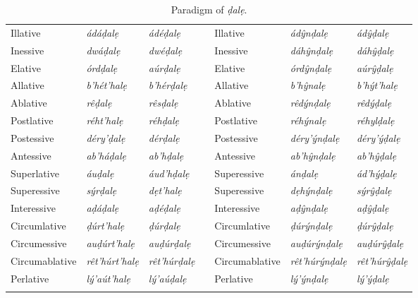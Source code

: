 \documentclass[a4paper, 12pt, twoside, openright, final]{book}
\let \w \textit
\begin{document}
\begin{longtable}{l|>{\it}l|>{\it}lll|>{\it}l|>{\it}l}
Illative          & ádáḍalẹ          & ádéḍalẹ            && Illative        & ádŷnḍalẹ        & ádŷḍalẹ     \\
Inessive          & dwáḍalẹ          & dwéḍalẹ            && Inessive        & dáhŷnḍalẹ       & dáhŷḍalẹ    \\
Elative           & órdḍalẹ          & aúrḍalẹ            && Elative         & órdŷnḍalẹ       & aúrŷḍalẹ    \\
Allative          & b’hét’halẹ       & b’hérḍalẹ          && Allative        & b’hŷnalẹ        & b’hýt’halẹ  \\
Ablative          & rêḍalẹ           & rêsḍalẹ            && Ablative        & rêdýnḍalẹ       & rêdýḍalẹ    \\
Postlative        & réht’halẹ        & réhḍalẹ            && Postlative      & réhýnalẹ        & réhylḍalẹ   \\
Postessive        & déry’ḍalẹ        & dérḍalẹ            && Postessive      & déry’ýnḍalẹ     & déry’ýḍalẹ  \\
Antessive         & ab’háḍalẹ        & ab’hḍalẹ           && Antessive       & ab’hŷnḍalẹ      & ab’hŷḍalẹ   \\
Superlative       & áuḍalẹ           & áud’hḍalẹ          && Superessive     & ánḍalẹ          & ád’hýḍalẹ   \\
Superessive       & sýrḍalẹ          & dẹt’halẹ           && Superessive     & dẹhýnḍalẹ       & sýrŷḍalẹ    \\
Interessive       & aḍáḍalẹ          & aḍéḍalẹ            && Interessive     & aḍŷnḍalẹ        & aḍŷḍalẹ     \\
Circumlative      & ḍúrt’halẹ        & ḍúrḍalẹ            && Circumlative    & ḍúrýnḍalẹ       & ḍúrŷḍalẹ    \\
Circumessive      & auḍúrt’halẹ      & auḍúrḍalẹ          && Circumessive    & auḍúrýnḍalẹ     & auḍúrŷḍalẹ  \\
Circumablative    & rêt’húrt’halẹ    & rêt’húrḍalẹ        && Circumablative  & rêt’húrýnḍalẹ   & rêt’húrŷḍalẹ \\
Perlative         & lý’aút’halẹ      & lý’aúḍalẹ          && Perlative       & lý’ýnḍalẹ       & lý’ýḍalẹ     \\
\noalign{\medskip}
\caption{Paradigm of \w{ḍalẹ}.}\label{tab:vocalic-declension}
\end{longtable}


\end{document}
